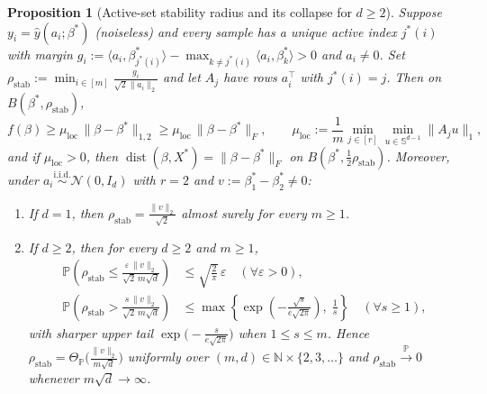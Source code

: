 \documentclass[11pt]{article}
\theoremstyle{plain}
\newtheorem{proposition}[theorem]{Proposition}
\theoremstyle{remark}
\numberwithin{equation}{section}
\newcommand{\N}{\mathbb{N}}
\newcommand{\Prob}{\mathbb{P}}
\newcommand{\Sph}{\mathbb{S}}
\newcommand{\ip}[2]{\langle #1, #2 \rangle}
\newcommand{\norm}[1]{\|#1\|}
\newcommand{\dist}{\operatorname{dist}}
\newcommand{\Fnorm}[1]{\|#1\|_F}
\newcommand{\Lonenorm}[1]{\|#1\|_{1,2}}
\begin{document}
\begin{proposition}[Active-set stability radius and its collapse for $d \ge 2$]
  \label{prop:stab-decay}
  Suppose $y_i = \hat y(a_i; \beta^*)$ (noiseless) and every sample has a unique active index $j^*(i)$ with margin $g_i := \ip{a_i}{\beta_{j^*(i)}^*} - \max_{k \ne j^*(i)} \ip{a_i}{\beta_k^*} > 0$ and $a_i \ne 0$. Set $\rho_{\mathrm{stab}} := \min_{i \in [m]} \frac{g_i}{\sqrt{2}\norm{a_i}_2}$ and let $A_j$ have rows $a_i^\top$ with $j^*(i) = j$. Then on $B(\beta^*, \rho_{\mathrm{stab}})$,
  \[
    f(\beta) \ge \mu_{\mathrm{loc}}\,\Lonenorm{\beta - \beta^*} \ge \mu_{\mathrm{loc}}\,\Fnorm{\beta - \beta^*},
    \qquad \mu_{\mathrm{loc}} := \frac{1}{m}\min_{j \in [r]}\min_{u \in \Sph^{d-1}} \norm{A_j u}_1,
  \]
  and if $\mu_{\mathrm{loc}} > 0$, then $\dist(\beta, X^*) = \Fnorm{\beta - \beta^*}$ on $B(\beta^*, \frac{1}{2}\rho_{\mathrm{stab}})$. Moreover, under $a_i \stackrel{\mathrm{i.i.d.}}{\sim} \mathcal{N}(0, I_d)$ with $r = 2$ and $v := \beta_1^* - \beta_2^* \ne 0$:
  \begin{enumerate}[label=(\alph*)]
    \item If $d = 1$, then $\rho_{\mathrm{stab}} = \frac{\norm{v}_2}{\sqrt{2}}$ almost surely for every $m \ge 1$.
    \item If $d \ge 2$, then for every $d \ge 2$ and $m \ge 1$,
    \begin{align*}
      \Prob\!\left(\rho_{\mathrm{stab}} \le \frac{\varepsilon\,\norm{v}_2}{\sqrt{2}\,m\sqrt{d}}\right)
      &\le \sqrt{\frac{2}{\pi}}\,\varepsilon \quad (\forall \varepsilon > 0), \\
      \Prob\!\left(\rho_{\mathrm{stab}} > \frac{s\,\norm{v}_2}{\sqrt{2}\,m\sqrt{d}}\right)
      &\le \max\!\left\{\exp\!\left(-\frac{\sqrt{s}}{e\sqrt{2\pi}}\right),\; \frac{1}{s}\right\} \quad (\forall s \ge 1),
    \end{align*}
    with sharper upper tail $\exp\bigl(-\frac{s}{e\sqrt{2\pi}}\bigr)$ when $1 \le s \le m$. Hence $\rho_{\mathrm{stab}} = \Theta_{\Prob}\bigl(\frac{\norm{v}_2}{m\sqrt{d}}\bigr)$ uniformly over $(m, d) \in \N \times \{2, 3, \dots\}$ and $\rho_{\mathrm{stab}} \xrightarrow{\Prob} 0$ whenever $m\sqrt{d} \to \infty$.
  \end{enumerate}
\end{proposition}
\end{document}
